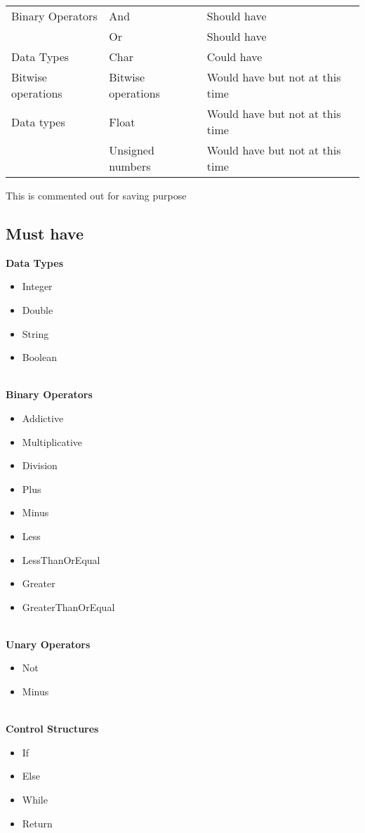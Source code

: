 \begin{table}[H]
\begin{tabular}{@{}lll@{}}
Binary Operators       & And                   & Should have                     \\
                       & Or                    & Should have                     \\ \midrule
Data Types             & Char                  & Could have                      \\\midrule
Bitwise operations     & Bitwise operations    & Would have but not at this time \\
Data types             & Float                 & Would have but not at this time \\
                       & Unsigned numbers      & Would   have but not at this time \\ \bottomrule
\end{tabular}
\end{table}

\iffalse 
This is commented out for saving purpose
\subsection{Must have}
\textbf{Data Types} 

\begin{itemize} 
    \item Integer
    \item Double
    \item String
    \item Boolean
\end{itemize} 
\\
\textbf{Binary Operators} \\
\begin{itemize} 
    \item Addictive
    \item Multiplicative
    \item Division
    \item Plus
    \item Minus
    \item Less
    \item LessThanOrEqual
    \item Greater
    \item GreaterThanOrEqual
\end{itemize} 
\\
\textbf{Unary Operators} \\
\begin{itemize} 
    \item Not
    \item Minus
\end{itemize}
\\
\textbf{Control Structures} \\
\begin{itemize} 
    \item If
    \item Else
    \item While
    \item Return
\end{itemize} 
\\
